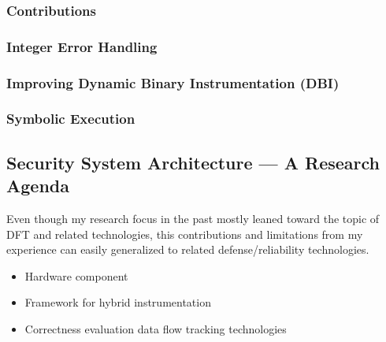 \documentclass[letterpaper, 10pt]{article}
\begin{document}
\begin{small}
\subsubsection*{Contributions}

\subsubsection*{Integer Error Handling}

\subsubsection*{Improving Dynamic Binary Instrumentation (DBI)}

\subsubsection*{Symbolic Execution}


\subsection*{Security System Architecture --- A Research Agenda}
Even though my research focus in the past mostly leaned toward the topic of DFT
and related technologies, this contributions and limitations from my experience
can easily generalized to related defense/reliability technologies.

\begin{itemize}
 \item Hardware component
 \item Framework for hybrid instrumentation
 \item Correctness evaluation data flow tracking technologies
\end{itemize}
\end{small}

\newpage



\end{document}
